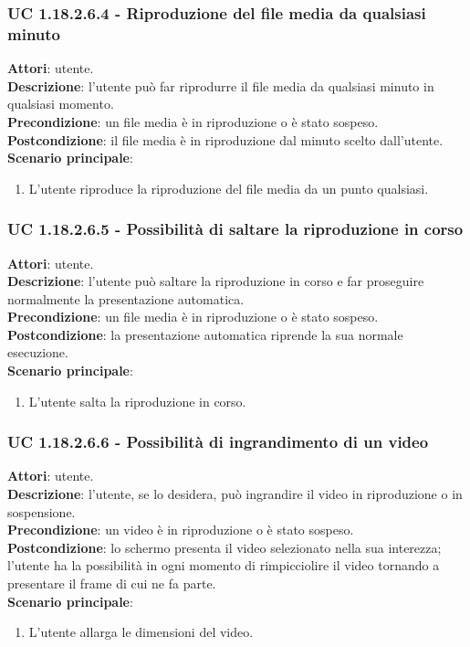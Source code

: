 	\subsubsection{UC 1.18.2.6.4 - Riproduzione del file media da qualsiasi minuto}{
		\label{uc1.18.2.6.4}
		\textbf{Attori}: utente. \\
		\textbf{Descrizione}: l'utente può far riprodurre il file media da qualsiasi minuto in qualsiasi momento. \\
		\textbf{Precondizione}: un file media è in riproduzione o è stato sospeso.	\\
		\textbf{Postcondizione}: il file media è in riproduzione dal minuto scelto dall'utente.\\
		\textbf{Scenario principale}:
		\begin{enumerate}
			\item L'utente riproduce la riproduzione del file media da un punto qualsiasi.
		\end{enumerate}				
	}
	\subsubsection{UC 1.18.2.6.5 - Possibilità di saltare la riproduzione in corso}{
		\label{uc1.18.2.6.5}
		\textbf{Attori}: utente. \\
		\textbf{Descrizione}: l'utente può saltare la riproduzione in corso e far proseguire normalmente la presentazione automatica. \\
		\textbf{Precondizione}: un file media è in riproduzione o è stato sospeso.	\\
		\textbf{Postcondizione}: la presentazione automatica riprende la sua normale esecuzione.\\
		\textbf{Scenario principale}:
		\begin{enumerate}
			\item L'utente salta la riproduzione in corso.
		\end{enumerate}						
	}
	\subsubsection{UC 1.18.2.6.6 - Possibilità di ingrandimento di un video}{
		\label{uc1.18.2.6.6}
		\textbf{Attori}: utente. \\
		\textbf{Descrizione}: l'utente, se lo desidera, può ingrandire il video in riproduzione o in sospensione. \\
		\textbf{Precondizione}: un video è in riproduzione o è stato sospeso.	\\
		\textbf{Postcondizione}: lo schermo presenta il video selezionato nella sua interezza; l'utente ha la possibilità in ogni momento di rimpicciolire il video tornando a presentare il frame di cui ne fa parte.\\
		\textbf{Scenario principale}:
		\begin{enumerate}
			\item L'utente allarga le dimensioni del video.
		\end{enumerate}						
	}
